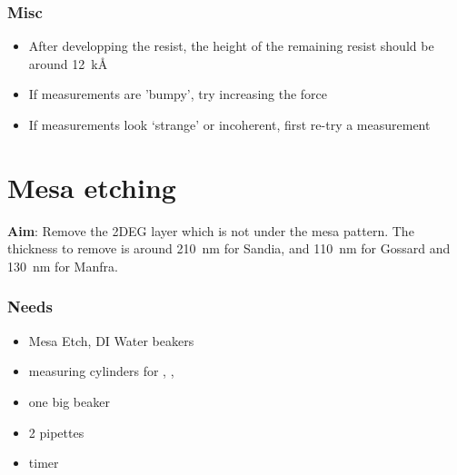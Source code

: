 \documentclass[12pt,a4paper]{report}
\begin{document}
\subsubsection{Misc}
\begin{itemize}
\item After developping the resist, the height of the remaining resist should be around \SI{12}{\kilo\angstrom}
\item If measurements are 'bumpy', try increasing the force
\item If measurements look `strange' or incoherent, first re-try a measurement
\end{itemize}
\newpage

\section{Mesa etching}

\textbf{Aim}:
Remove the 2DEG layer which is not under the mesa pattern. The thickness to remove is around \SI{210}{\nano\meter} for Sandia, and \SI{110}{\nano\meter} for Gossard
and \SI{130}{\nano\meter} for Manfra.

\subsubsection{Needs}
\begin{itemize}[noitemsep]
\item Mesa Etch, DI Water beakers
\item measuring cylinders for , , 
\item one big beaker
\item 2 pipettes
\item timer
\end{itemize}
\end{document}
